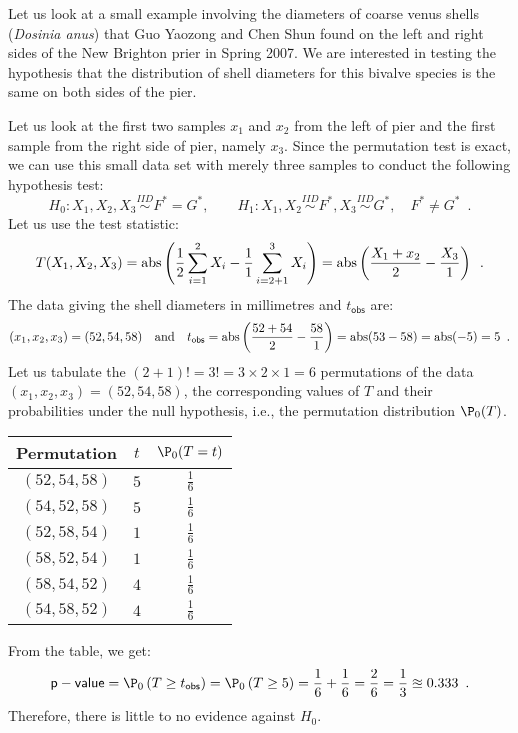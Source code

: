 Let us look at a small example involving the diameters of coarse venus shells ({\em Dosinia anus}) that Guo Yaozong and Chen Shun found on the left and right sides of the New Brighton prier in Spring 2007.  We are interested in testing the hypothesis that the distribution of shell diameters for this bivalve species is the same on both sides of the pier.  
\begin{example}
Let us look at the first two samples $x_1$ and $x_2$ from the left of pier and the first sample from the right side of pier, namely $x_3$.  Since the permutation test is exact, we can use this small data set with merely three samples to conduct the following hypothesis test:
\[
H_0: X_1,X_2,X_3 \overset{IID}{\sim} F^*=G^*, \qquad H_1: X_1,X_2 \overset{IID}{\sim} F^*, X_3 \overset{IID}{\sim} G^*, \quad F^* \neq G^* \enspace .
\] 
Let us use the test statistic:
\[
T(X_1,X_2,X_3)=\operatorname{abs} \left( \frac{1}{2} \sum_{i=1}^2 X_i -  \frac{1}{1} \sum_{i=2+1}^3 X_i  \right)=\operatorname{abs} \left( \frac{X_1+x_2}{2} -  \frac{X_3}{1} \right) \enspace .
\]
The data giving the shell diameters in millimetres and $t_{\mathsf{obs}}$ are:
\[
(x_1,x_2,x_3) = (52,54,58) \quad \text{and} \quad t_{\mathsf{obs}}=\operatorname{abs} \left( \frac{52+54}{2} - \frac{58}{1} \right) = \operatorname{abs} (53-58) = \operatorname{abs}(-5)=5 \enspace .
\]
Let us tabulate the $(2+1)!=3!=3\times2\times1=6$ permutations of the data $(x_1,x_2,x_3) = (52,54,58)$, the corresponding values of $T$ and their probabilities under the null hypothesis, i.e., the permutation distribution $\P_0(T)$.
\begin{center}
\begin{tabular}{c c c}
\hline
Permutation & $t$ & $\P_0(T=t)$ \\ \hline
$(52,54,58)$ & $5$ & $\frac{1}{6}$ \\
$(54,52,58)$ & $5$ & $\frac{1}{6}$  \\
$(52,58,54)$ & $1$ & $\frac{1}{6}$  \\
$(58,52,54)$ & $1$ &$\frac{1}{6}$  \\
$(58,54,52)$ & $4$ & $\frac{1}{6}$  \\
$(54,58,52)$ & $4$ & $\frac{1}{6}$  \\ \hline
\end{tabular}
\end{center}
From the table, we get:
\[
\pvalue = \P_0 \left( T \geq t_{\mathsf{obs}}\right) =  \P_0 \left( T \geq 5 \right) = \frac{1}{6}+ \frac{1}{6}= \frac{2}{6}= \frac{1}{3} \approxeq 0.333 \enspace . 
\]
Therefore, there is little to no evidence against $H_0$.
\end{example}

